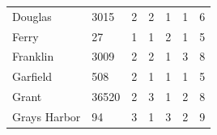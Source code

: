 \documentclass{mcmthesis}
\numberwithin{figure}{section}
\numberwithin{table}{section}
\begin{document}
\begin{table}[H]
\begin{tabular}{lllllll}
  Douglas      & 3015                                                   & 2                                                                             & 2                                                                 & 1                                                                           & 1                                                                                     & 6                                                                          \\
  Ferry        & 27                                                     & 1                                                                             & 1                                                                 & 2                                                                           & 1                                                                                     & 5                                                                          \\
  Franklin     & 3009                                                   & 2                                                                             & 2                                                                 & 1                                                                           & 3                                                                                     & 8                                                                          \\
  Garfield     & 508                                                    & 2                                                                             & 1                                                                 & 1                                                                           & 1                                                                                     & 5                                                                          \\
  Grant        & 36520                                                  & 2                                                                             & 3                                                                 & 1                                                                           & 2                                                                                     & 8                                                                          \\
  Grays Harbor & 94                                                     & 3                                                                             & 1                                                                 & 3                                                                           & 2                                                                                     & 9                                                                          \\

\end{tabular}
\end{table}
\end{document}
